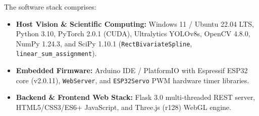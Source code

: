 The software stack comprises:
\begin{itemize}
    \item \textbf{Host Vision \& Scientific Computing:} Windows 11 / Ubuntu 22.04 LTS, Python 3.10, PyTorch 2.0.1 (CUDA), Ultralytics YOLOv8s, OpenCV 4.8.0, NumPy 1.24.3, and SciPy 1.10.1 (\texttt{RectBivariateSpline}, \texttt{linear\_sum\_assignment}).
    \item \textbf{Embedded Firmware:} Arduino IDE / PlatformIO with Espressif ESP32 core (v2.0.11), \texttt{WebServer}, and \texttt{ESP32Servo} PWM hardware timer libraries.
    \item \textbf{Backend \& Frontend Web Stack:} Flask 3.0 multi-threaded REST server, HTML5/CSS3/ES6+ JavaScript, and Three.js (r128) WebGL engine.
\end{itemize}
